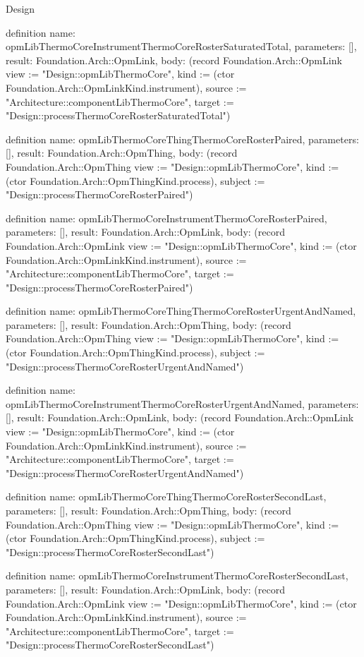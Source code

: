 \begin{lexlean}{Design}
\begin{semanticmodule}
definition{
  name: opmLibThermoCoreInstrumentThermoCoreRosterSaturatedTotal,
  parameters: [],
  result: Foundation.Arch::OpmLink,
  body: (record Foundation.Arch::OpmLink {view := "Design::opmLibThermoCore", kind := (ctor Foundation.Arch::OpmLinkKind.instrument), source := "Architecture::componentLibThermoCore", target := "Design::processThermoCoreRosterSaturatedTotal"})
}

definition{
  name: opmLibThermoCoreThingThermoCoreRosterPaired,
  parameters: [],
  result: Foundation.Arch::OpmThing,
  body: (record Foundation.Arch::OpmThing {view := "Design::opmLibThermoCore", kind := (ctor Foundation.Arch::OpmThingKind.process), subject := "Design::processThermoCoreRosterPaired"})
}

definition{
  name: opmLibThermoCoreInstrumentThermoCoreRosterPaired,
  parameters: [],
  result: Foundation.Arch::OpmLink,
  body: (record Foundation.Arch::OpmLink {view := "Design::opmLibThermoCore", kind := (ctor Foundation.Arch::OpmLinkKind.instrument), source := "Architecture::componentLibThermoCore", target := "Design::processThermoCoreRosterPaired"})
}

definition{
  name: opmLibThermoCoreThingThermoCoreRosterUrgentAndNamed,
  parameters: [],
  result: Foundation.Arch::OpmThing,
  body: (record Foundation.Arch::OpmThing {view := "Design::opmLibThermoCore", kind := (ctor Foundation.Arch::OpmThingKind.process), subject := "Design::processThermoCoreRosterUrgentAndNamed"})
}

definition{
  name: opmLibThermoCoreInstrumentThermoCoreRosterUrgentAndNamed,
  parameters: [],
  result: Foundation.Arch::OpmLink,
  body: (record Foundation.Arch::OpmLink {view := "Design::opmLibThermoCore", kind := (ctor Foundation.Arch::OpmLinkKind.instrument), source := "Architecture::componentLibThermoCore", target := "Design::processThermoCoreRosterUrgentAndNamed"})
}

definition{
  name: opmLibThermoCoreThingThermoCoreRosterSecondLast,
  parameters: [],
  result: Foundation.Arch::OpmThing,
  body: (record Foundation.Arch::OpmThing {view := "Design::opmLibThermoCore", kind := (ctor Foundation.Arch::OpmThingKind.process), subject := "Design::processThermoCoreRosterSecondLast"})
}

definition{
  name: opmLibThermoCoreInstrumentThermoCoreRosterSecondLast,
  parameters: [],
  result: Foundation.Arch::OpmLink,
  body: (record Foundation.Arch::OpmLink {view := "Design::opmLibThermoCore", kind := (ctor Foundation.Arch::OpmLinkKind.instrument), source := "Architecture::componentLibThermoCore", target := "Design::processThermoCoreRosterSecondLast"})
}


\end{semanticmodule}
\end{lexlean}
